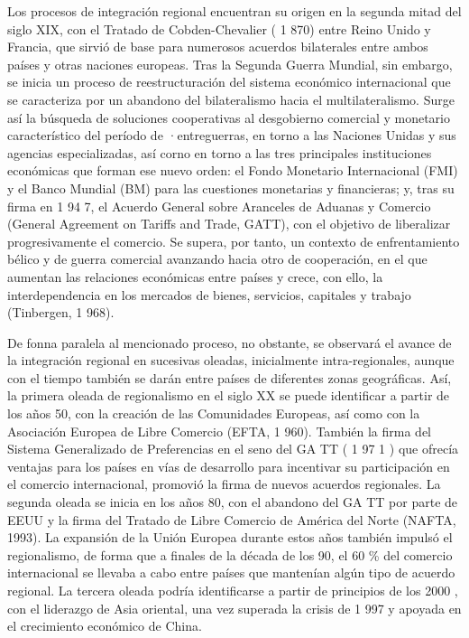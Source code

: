 \documentclass[10pt,a4paper]{article}
\begin{document}
Los procesos de integración regional encuentran su origen en la segunda mitad del siglo XIX, con el Tratado de Cobden-Chevalier ( 1 870) entre Reino Unido y Francia, que sirvió de base para numerosos acuerdos bilaterales entre ambos países y otras naciones europeas. Tras la Segunda Guerra Mundial, sin embargo, se inicia un proceso de reestructuración del sistema económico internacional que se caracteriza por un abandono del bilateralismo hacia el multilateralismo. Surge así la búsqueda de soluciones cooperativas al desgobierno comercial y monetario característico del período de ·entreguerras, en torno a las Naciones Unidas y sus agencias especializadas, así corno en torno a las tres principales instituciones económicas que forman ese nuevo orden: el Fondo Monetario Internacional (FMI) y el Banco Mundial (BM) para las cuestiones monetarias y financieras; y, tras su firma en 1 94 7, el Acuerdo General sobre Aranceles de Aduanas y Comercio (General Agreement on Tariffs and Trade, GATT), con el objetivo de liberalizar progresivamente el comercio. Se supera, por tanto, un contexto de enfrentamiento bélico y de guerra comercial avanzando hacia otro de cooperación, en el que aumentan las relaciones económicas entre países y crece, con ello, la interdependencia en los mercados de bienes, servicios, capitales y trabajo (Tinbergen, 1 968).

De fonna paralela al mencionado proceso, no obstante, se observará el avance de la integración regional en sucesivas oleadas, inicialmente intra-regionales, aunque con el tiempo también se darán entre países de diferentes zonas geográficas. Así, la primera oleada de regionalismo en el siglo XX se puede identificar a partir de los años 50, con la creación de las Comunidades Europeas, así como con la Asociación Europea de Libre Comercio (EFTA, 1 960). También la firma del Sistema Generalizado de Preferencias en el seno del GA TT ( 1 97 1 ) que ofrecía ventajas para los países en vías de desarrollo para incentivar su participación en el comercio internacional, promovió la firma de nuevos acuerdos regionales. La segunda oleada se inicia en los años 80, con el abandono del GA TT por parte de EEUU y la firma del Tratado de Libre Comercio de América del Norte (NAFTA, 1993). La expansión de la Unión Europea durante estos años también impulsó el regionalismo, de forma que a finales de la década de los 90, el 60 \% del comercio internacional se llevaba a cabo entre países que mantenían algún tipo de acuerdo regional. La tercera oleada podría identificarse a partir de principios de los 2000 , con el liderazgo de Asia oriental, una vez superada la crisis de 1 997 y apoyada en el crecimiento económico de China.
\end{document}
